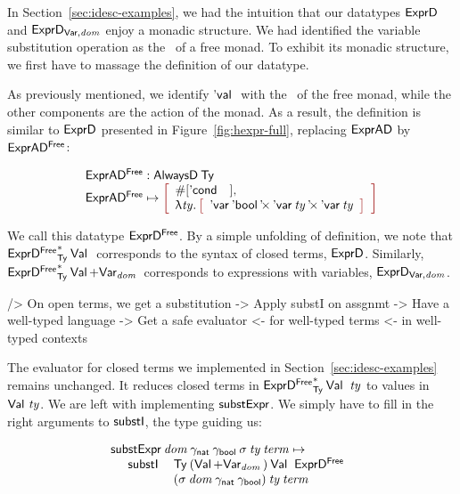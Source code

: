 In Section~\ref{sec:idesc-examples}, we had the intuition that our
datatypes $\HExprD$ and $\HExprVarD{\V{dom}}$ enjoy a monadic
structure. We had identified the variable substitution operation as
the \bind\ of a free monad. To exhibit its monadic structure, we first
have to massage the definition of our datatype.

As previously mentioned, we identify $\Eval{}$ with the \return\ of
the free monad, while the other components are the action of the
monad. As a result, the definition is similar to $\HExprD$ presented
in Figure~\ref{fig:hexpr-full}, replacing $\HExprAD$ by
$\HExprAFreeD$:

\[\stk{
\HExprAFreeD : \ATagIDesc{\Ty} \\
\HExprAFreeD \mapsto \bigRedBracket{
                 \begin{array}{l}
                   \EnumT{\red{[}\Econd{}{}{}\red{]}} \red{,} \\
                   \LAM{\V{ty}}
                   \bigRedBracket{
                   \begin{array}{l}
                   \DProd{\DVar{\Ebool}}{\DProd{\DVar{\V{ty}}}{\DVar{\V{ty}}}}
                   \end{array}
                   }
                 \end{array}
                 }
}\]

We call this datatype $\HExprFreeD$. By a simple unfolding of
definition, we note that $\FreeIMonad{\HExprFreeD}{\Ty}{\Val{}}$
corresponds to the syntax of closed terms, $\HExprD$. Similarly,
$\FreeIMonad{\HExprFreeD}{\Ty}{\SUM{\Val{\!}}{\Var{\V{dom}}{\!}}}$
corresponds to expressions with variables, $\HExprVarD{\V{dom}}$.

\begin{wstructure}
    /> On open terms, we get a substitution
        -> Apply substI on assgnmt
            -> Have a well-typed language
            -> Get a safe evaluator 
                <- for well-typed terms 
                <- in well-typed contexts
\end{wstructure}

The evaluator for closed terms we implemented in
Section~\ref{sec:idesc-examples} remains unchanged. It reduces closed
terms in $\FreeIMonad{\HExprFreeD}{\Ty}{\Val{}}\: \V{ty}$ to values in
$\Val{\V{ty}}$. We are left with implementing $\substH$. We simply
have to fill in the right arguments to $\substI$, the type guiding us:


\[\stk{
\substH\: \V{dom}\:
          \gammaNat\: \gammaBool\:
          \V{\sigma}\: 
          \V{ty}\: 
          \V{term} \mapsto  \\
\;\;\ \begin{array}{ll}
       \substI\: & \Ty\: 
                  (\SUM{\Val{\!}}{\Var{\V{dom}}{\!}})\: 
                  \Val{}\:
                  \HExprFreeD\:  \\
                &
                  (\V{\sigma}\: \V{dom}\: \gammaNat\: \gammaBool)\:
                  \V{ty}\:
                  \V{term}
      \end{array}
}\]

